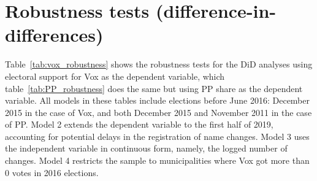 \documentclass[12pt, titlepage]{article}
\begin{document}
\section{Robustness tests (difference-in-differences)}

Table~\ref{tab:vox_robustness} shows the robustness tests for the DiD analyses using electoral support for Vox as the dependent variable, which table~\ref{tab:PP_robustness} does the same but using PP share as the dependent variable.
All models in these tables include elections before June 2016: December 2015 in the case of Vox, and both December 2015 and November 2011 in the case of PP.
Model 2 extends the dependent variable to the first half of 2019, accounting for potential delays in the registration of name changes.
Model 3 uses the independent variable in continuous form, namely, the logged number of changes.
Model 4 restricts the sample to municipalities where Vox got more than 0 votes in 2016 elections.
\end{document}
